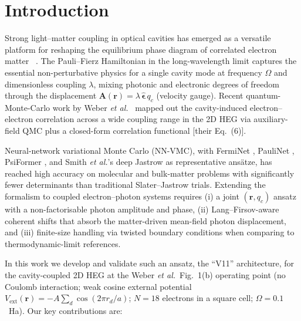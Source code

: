 \documentclass[reprint,amsmath,amssymb,aps,prb,floatfix,nofootinbib]{revtex4-2}
\begin{document}
\maketitle

\section{Introduction}
Strong light--matter coupling in optical cavities has emerged as a
versatile platform for reshaping the equilibrium phase diagram of
correlated electron matter
~\cite{Hubener2021,Schlawin2022,Garcia-Vidal2021}.  The Pauli--Fierz
Hamiltonian in the long-wavelength limit captures the essential
non-perturbative physics for a single cavity mode at frequency $\Omega$
and dimensionless coupling $\lambda$, mixing photonic and electronic
degrees of freedom through the displacement
$\mathbf{A}(\mathbf{r}) = \lambda \, \hat{\bm{\epsilon}}\, q_c$
(velocity gauge).  Recent quantum-Monte-Carlo work by Weber
\emph{et al.}~\cite{Weber2024} mapped out the cavity-induced
electron--electron correlation across a wide coupling range in the
2D HEG via auxiliary-field QMC plus a closed-form correlation
functional [their Eq.~(6)].

Neural-network variational Monte Carlo (NN-VMC), with FermiNet
\cite{Pfau2020}, PauliNet \cite{Hermann2020}, PsiFormer
\cite{vonGlehn2023}, and Smith \emph{et al.}'s deep Jastrow
\cite{Smith2024} as representative ans\"atze, has reached high
accuracy on molecular and bulk-matter problems with significantly
fewer determinants than traditional Slater--Jastrow trials.  Extending
the formalism to coupled electron--photon systems requires (i) a
joint $(\mathbf{r}, q_c)$ ansatz with a non-factorisable photon
amplitude and phase, (ii) Lang--Firsov-aware coherent shifts that
absorb the matter-driven mean-field photon displacement, and
(iii) finite-size handling via twisted boundary conditions
\cite{Lin2001,Drummond2008} when comparing to thermodynamic-limit
references.

In this work we develop and validate such an ansatz, the ``V11''
architecture, for the cavity-coupled 2D HEG at the Weber
\emph{et al.}~Fig.~1(b) operating point (no Coulomb interaction; weak
cosine external potential $V_{\mathrm{ext}}(\mathbf{r}) = -A
\sum_d \cos(2\pi r_d / a)$; $N=18$ electrons in a square cell;
$\Omega = 0.1$~Ha).  Our key contributions are:
\end{document}
